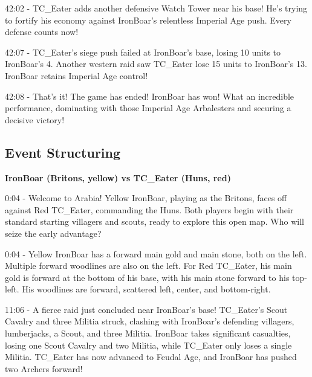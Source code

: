 42:02 - TC\_Eater adds another defensive Watch Tower near his base! He's trying to fortify his economy against IronBoar's relentless Imperial Age push. Every defense counts now! \par \vspace{1em}

42:07 - TC\_Eater's siege push failed at IronBoar's base, losing 10 units to IronBoar's 4. Another western raid saw TC\_Eater lose 15 units to IronBoar's 13. IronBoar retains Imperial Age control! \par \vspace{1em}

42:08 - That's it! The game has ended! IronBoar has won! What an incredible performance, dominating with those Imperial Age Arbalesters and securing a decisive victory! \par \vspace{1em}

\subsection{Event Structuring}
\textbf{IronBoar (Britons, yellow) vs TC\_Eater (Huns, red)}

0:04 - Welcome to Arabia! Yellow IronBoar, playing as the Britons, faces off against Red TC\_Eater, commanding the Huns. Both players begin with their standard starting villagers and scouts, ready to explore this open map. Who will seize the early advantage? \par \vspace{1em}

0:04 - Yellow IronBoar has a forward main gold and main stone, both on the left. Multiple forward woodlines are also on the left. For Red TC\_Eater, his main gold is forward at the bottom of his base, with his main stone forward to his top-left. His woodlines are forward, scattered left, center, and bottom-right. \par \vspace{1em}

11:06 - A fierce raid just concluded near IronBoar's base! TC\_Eater's Scout Cavalry and three Militia struck, clashing with IronBoar's defending villagers, lumberjacks, a Scout, and three Militia. IronBoar takes significant casualties, losing one Scout Cavalry and two Militia, while TC\_Eater only loses a single Militia. TC\_Eater has now advanced to Feudal Age, and IronBoar has pushed two Archers forward! \par \vspace{1em}


